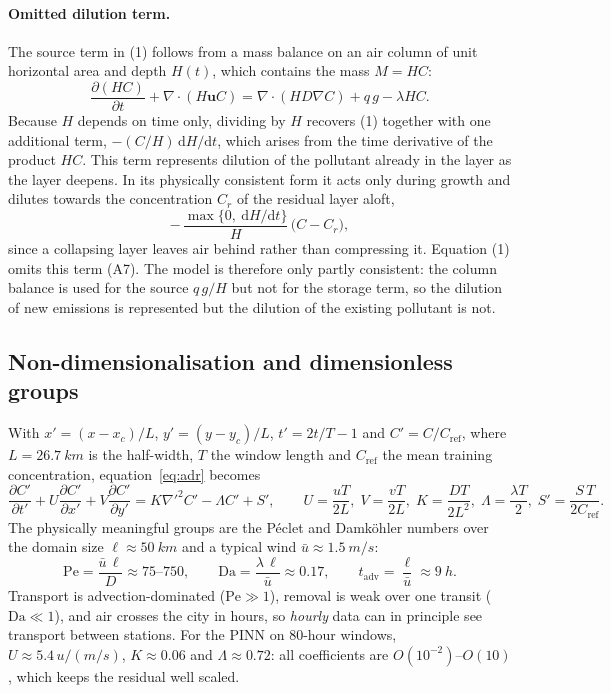 \documentclass[11pt,a4paper]{article}
\newcommand{\pd}[2]{\frac{\partial #1}{\partial #2}}
\begin{document}
\paragraph{Omitted dilution term.}
The source term in (1) follows from a mass balance on an air column of unit
horizontal area and depth $H(t)$, which contains the mass $M = HC$:
\begin{equation*}
  \frac{\partial (HC)}{\partial t} + \nabla\!\cdot\!(H\mathbf{u}C)
  = \nabla\!\cdot\!(HD\nabla C) + q\,g - \lambda H C .
\end{equation*}
Because $H$ depends on time only, dividing by $H$ recovers (1) together with one
additional term, $-(C/H)\,\mathrm{d}H/\mathrm{d}t$, which arises from the time
derivative of the product $HC$. This term represents dilution of the pollutant
already in the layer as the layer deepens. In its physically consistent form it
acts only during growth and dilutes towards the concentration $C_r$ of the
residual layer aloft,
\begin{equation*}
  -\,\frac{\max\{0,\ \mathrm{d}H/\mathrm{d}t\}}{H}\,\bigl(C - C_r\bigr),
\end{equation*}
since a collapsing layer leaves air behind rather than compressing it. Equation
(1) omits this term (A7). The model is therefore only partly consistent: the
column balance is used for the source $q\,g/H$ but not for the storage term, so
the dilution of new emissions is represented but the dilution of the existing
pollutant is not.

\subsection{Non-dimensionalisation and dimensionless groups}
With $x' = (x-x_c)/L$, $y'=(y-y_c)/L$, $t'=2t/T-1$ and $C'=C/C_{\mathrm{ref}}$, where $L=\SI{26.7}{km}$ is the
half-width, $T$ the window length and $C_{\mathrm{ref}}$ the mean training concentration, equation~\eqref{eq:adr}
becomes
\begin{equation}
\pd{C'}{t'} + U\pd{C'}{x'} + V\pd{C'}{y'} = K\nabla'^2C' - \Lambda C' + S',\qquad
U=\frac{uT}{2L},\; V=\frac{vT}{2L},\; K=\frac{DT}{2L^2},\; \Lambda=\frac{\lambda T}{2},\; S'=\frac{S\,T}{2C_{\mathrm{ref}}}.
\label{eq:nondim}
\end{equation}
The physically meaningful groups are the P\'eclet and Damk\"ohler numbers over the domain size
$\ell\approx\SI{50}{km}$ and a typical wind $\bar u\approx\SI{1.5}{m/s}$:
\begin{equation}
\mathrm{Pe}=\frac{\bar u\,\ell}{D}\approx 75\text{--}750,\qquad
\mathrm{Da}=\frac{\lambda\,\ell}{\bar u}\approx 0.17,\qquad
t_{\mathrm{adv}}=\frac{\ell}{\bar u}\approx \SI{9}{h}.
\end{equation}
Transport is advection-dominated ($\mathrm{Pe}\gg1$), removal is weak over one transit
($\mathrm{Da}\ll1$), and air crosses the city in hours, so \emph{hourly} data can in principle see transport
between stations. For the PINN on 80-hour windows, $U\approx 5.4\,u/(\si{m/s})$, $K\approx 0.06$ and
$\Lambda\approx0.72$: all coefficients are $O(10^{-2})$--$O(10)$, which keeps the residual well scaled.
\end{document}
